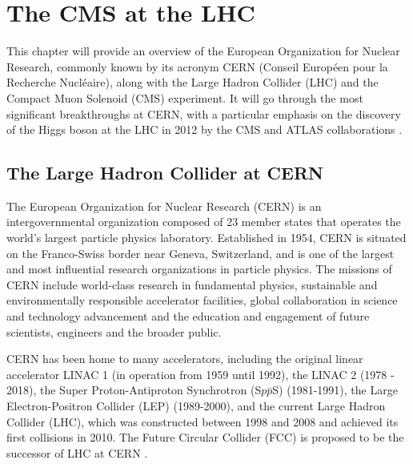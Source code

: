\chapter[The CMS at the LHC]{The CMS at the LHC}

This chapter will provide an overview of the European Organization for Nuclear Research, commonly known by its acronym CERN (Conseil Européen pour la Recherche Nucléaire), along with the Large Hadron Collider (LHC) and the Compact Muon Solenoid (CMS) experiment. It will go through the most significant breakthroughs at CERN, with a particular emphasis on the discovery of the Higgs boson at the LHC in 2012 by the CMS and ATLAS collaborations \cite{CMS:2012qbp,ATLAS:2012yve}.

\section{The Large Hadron Collider at CERN}

The European Organization for Nuclear Research (CERN) is an intergovernmental organization composed of 23 member states that operates the world's largest particle physics laboratory. Established in 1954, CERN is situated on the Franco-Swiss border near Geneva, Switzerland, and is one of the largest and most influential research organizations in particle physics. The missions of CERN include world-class research in fundamental physics, sustainable and environmentally responsible accelerator facilities, global collaboration in science and technology advancement and the education and engagement of future scientists, engineers and the broader public.

CERN has been home to many accelerators, including the original linear accelerator \linebreak LINAC 1 (in operation from 1959 until 1992), the LINAC 2 (1978 - 2018), the Super Proton-Antiproton Synchrotron (S$p\bar{p}$S) (1981-1991), the Large Electron-Positron Collider (LEP) (1989-2000), and the current Large Hadron Collider (LHC), which was constructed between 1998 and 2008 and achieved its first collisions in 2010. The Future Circular Collider (FCC) is proposed to be the successor of LHC at CERN \cite{FCC:2018byv}.

